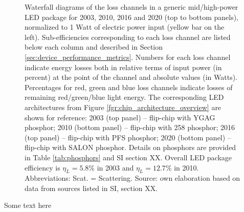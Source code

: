 \documentclass[twoside,twocolumn,9pt]{article}
\begin{document}
\begin{figure}[h!]
 \caption{Waterfall diagrams of the loss channels in a generic mid/high-power LED package for 2003, 2010, 2016 and 2020 (top to bottom panels), normalized to 1 Watt of electric power input (yellow bar on the left). Sub-efficiencies corresponding to each loss channel are listed below each column and described in Section \ref{sec:device_performance_metrics}. Numbers for each loss channel indicate energy losses both in relative terms of input power (in percent) at the point of the channel and absolute values (in Watts). Percentages for red, green and blue loss channels indicate losses of remaining red/green/blue light energy. The corresponding LED architectures from Figure \ref{fgr:chip_architecture_overview} are shown for reference: 2003 (top panel) – flip-chip with YGAG phosphor; 2010 (bottom panel) – flip-chip with 258 phosphor; 2016 (top panel) – flip-chip with PFS phosphor; 2020 (bottom panel) – flip-chip with SALON phosphor. Details on phosphors are provided in Table \ref{tab:phosphors} and SI section XX. Overall LED package efficiency is $\eta_L = 5.8\%$ in 2003 and $\eta_L = 12.7\%$ in 2010. Abbreviations: Scat. = Scattering. Source: own elaboration based on data from sources listed in SI, section XX.}
 \label{fgr:waterfall}
\end{figure}

Some text here
\end{document}
